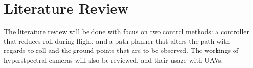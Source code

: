 \section{Literature Review}

The literature review will be done with focus on two control methods: a controller that reduces roll during flight, and a path planner that alters the path with regards to roll and the ground points that are to be observed. The workings of hyperstpectral cameras will also be reviewed, and their usage with UAVs.
